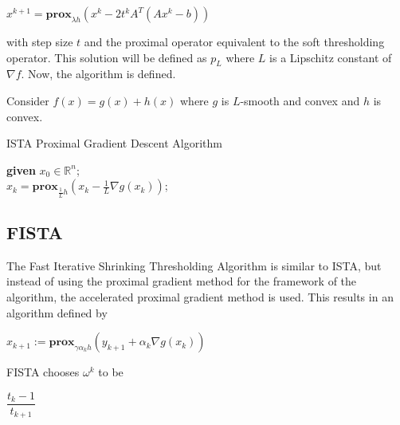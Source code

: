 \documentclass[10pt]{article} %
\begin{document}
\begin{center}
    $x^{k+1} = \mathbf{prox}_{\lambda h} (x^k - 2t^kA^T(Ax^k-b))$
\end{center}

with step size $t$ and the proximal operator equivalent to the soft thresholding operator. This solution will be defined as $p_L$ where $L$ is a Lipschitz constant of $\nabla f$. Now, the algorithm is defined.




Consider $f(x)=g(x)+h(x)$ where $g$ is $L$-smooth and convex and $h$ is convex.\\
\vspace{20pt}
\begin{algorithm}[H]
\caption{ISTA Proximal Gradient Descent Algorithm}
        
    	\textbf{given} $x_0 \in \mathbb{R}^n$;\\
     	{
      		$x_k = \mathbf{prox}_{\frac{1}{L}h}(x_k-\frac{1}{L}\nabla g(x_k))$;
      	}
    \end{algorithm}


\vspace{\baselineskip}


\subsection{FISTA}

The Fast Iterative Shrinking Thresholding Algorithm is similar to ISTA, but instead of using the proximal gradient method for the framework of the algorithm, the accelerated proximal gradient method is used. This results in an algorithm defined by 

\begin{center}
    $x_{k+1} := \mathbf{prox}_{\gamma \alpha_k h} (y_{k+1} + \alpha_k \nabla g(x_k))$
\end{center}




\noindent FISTA chooses $\omega^k$ to be 

\begin{center}
    $\dfrac{t_k - 1}{t_{k+1}}$
\end{center}
\end{document}
